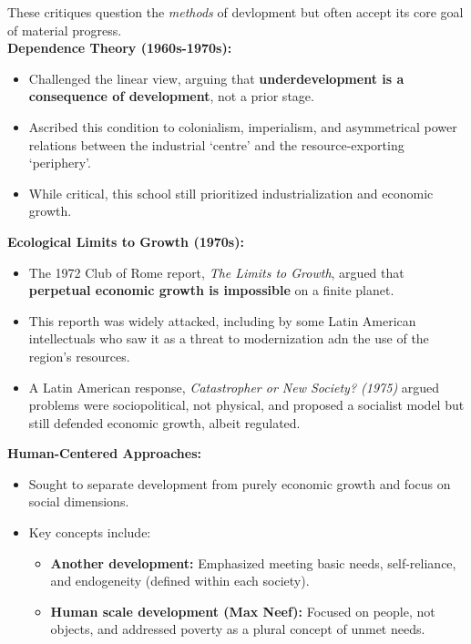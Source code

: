 \documentclass{article}
\begin{document}
    \noindent These critiques question the \textit{methods} of devlopment
but often accept its core goal of material progress.\\

    \noindent \textbf{Dependence Theory (1960s-1970s):}
    \begin{itemize}
        \item Challenged the linear view, arguing that
        \textbf{underdevelopment is a consequence of development}, not a
        prior stage.
        \item Ascribed this condition to colonialism, imperialism, and
        asymmetrical power relations between the industrial `centre' and the
        resource-exporting `periphery'.
        \item While critical, this school still prioritized
        industrialization and economic growth.
    \end{itemize}

    \noindent \textbf{Ecological Limits to Growth (1970s):}
    \begin{itemize}
        \item The 1972 Club of Rome report, \textit{The Limits to Growth},
        argued that \textbf{perpetual economic growth is impossible} on a
        finite planet.
        \item This reporth was widely attacked, including by some Latin
        American intellectuals who saw it as a threat to modernization adn
        the use of the region's resources.
        \item A Latin American response,
        \textit{Catastropher or New Society? (1975)} argued problems were
        sociopolitical, not physical, and proposed a socialist model but
        still defended economic growth, albeit regulated.
    \end{itemize}

    \noindent \textbf{Human-Centered Approaches:}
    \begin{itemize}
        \item Sought to separate development from purely economic growth and
        focus on social dimensions.
        \item Key concepts include:
        \begin{itemize}
            \item \textbf{Another development:} Emphasized meeting basic
            needs, self-reliance, and endogeneity (defined within each society).
            \item \textbf{Human scale development (Max Neef):} Focused on
            people, not objects, and addressed poverty as a plural concept
            of unmet needs.
        \end{itemize}
    \end{itemize}
\end{document}
